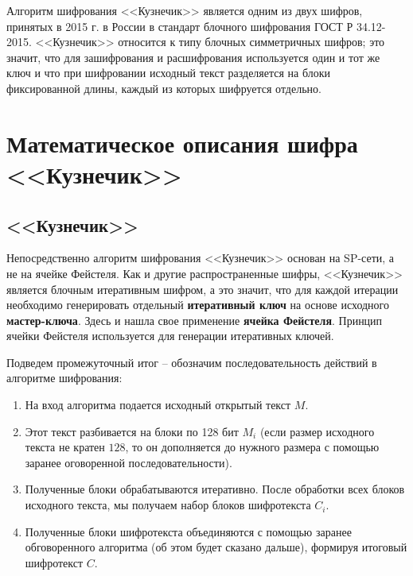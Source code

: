 \documentclass[a4paper, 12pt]{article}
\begin{document}
    Алгоритм шифрования <<Кузнечик>> является одним из двух шифров, принятых в 2015 г.
    в России в стандарт блочного шифрования ГОСТ Р 34.12-2015. <<Кузнечик>> относится
    к типу блочных симметричных шифров; это значит, что для зашифрования и
    расшифрования используется один и тот же ключ и что при шифровании исходный текст
    разделяется на блоки фиксированной длины, каждый из которых шифруется отдельно.

    \section{Математическое описания шифра <<Кузнечик>>}



    \subsection{<<Кузнечик>>}

    Непосредственно алгоритм шифрования <<Кузнечик>> основан на SP-сети, а не на ячейке 
    Фейстеля. Как и другие распространенные шифры, <<Кузнечик>> является блочным итеративным 
    шифром, а это значит, что для каждой итерации необходимо генерировать отдельный 
    \textbf{итеративный ключ} на основе исходного \textbf{мастер-ключа}. Здесь и
    нашла свое применение \textbf{ячейка Фейстеля}. Принцип ячейки Фейстеля используется
    для генерации итеративных ключей.

    Подведем промежуточный итог -- обозначим последовательность действий в алгоритме 
    шифрования:

    \begin{enumerate}
        \item На вход алгоритма подается исходный открытый текст $M$.
        \item Этот текст разбивается на блоки по 128 бит $M_i$ (если размер исходного текста не кратен $128$, то он дополняется до нужного размера с помощью заранее оговоренной последовательности).
        \item Полученные блоки обрабатываются итеративно. После обработки всех блоков исходного текста, мы получаем набор блоков шифротекста $C_i$.
        \item Полученные блоки шифротекста объединяются с помощью заранее обговоренного алгоритма (об этом будет сказано дальше), формируя итоговый шифротекст $C$.
    \end{enumerate}
\end{document}
